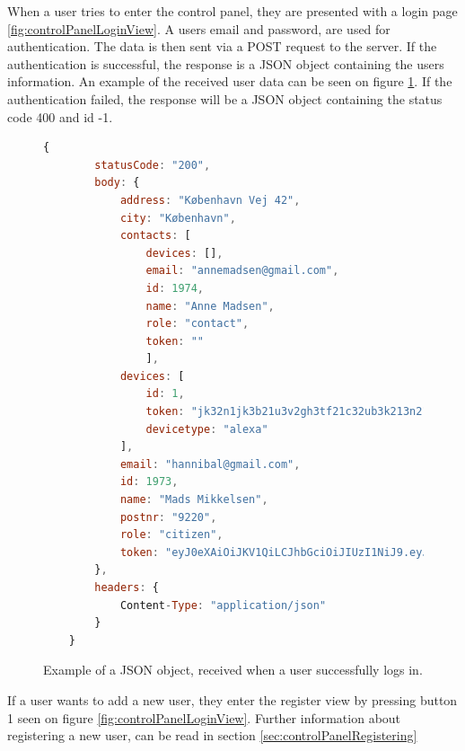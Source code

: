 When a user tries to enter the control panel, they are presented with a login page \ref{fig:controlPanelLoginView}. A users email and password, are used for authentication. The data is then sent via a POST request to the server. If the authentication is successful, the response is a JSON object containing the users information. An example of the received user data can be seen on figure \ref{lst:userLoginJSON}. If the authentication failed, the response will be a JSON object containing the status code 400 and id -1.

\begin{figure}[H]
    \centering
    \begin{lstlisting}[language=Javascript]
    {
        statusCode: "200",
        body: {
            address: "København Vej 42",
            city: "København",
            contacts: [
                devices: [],
                email: "annemadsen@gmail.com",
                id: 1974,
                name: "Anne Madsen",
                role: "contact",
                token: ""
                ],
            devices: [
                id: 1,
                token: "jk32n1jk3b21u3v2gh3tf21c32ub3k213n21kjn32hj",
                devicetype: "alexa"
            ],
            email: "hannibal@gmail.com",
            id: 1973,
            name: "Mads Mikkelsen",
            postnr: "9220",
            role: "citizen", 
            token: "eyJ0eXAiOiJKV1QiLCJhbGciOiJIUzI1NiJ9.eyJ1c2VyX2lkIjoxOTczLCJ1c2VyX3JvbGUiOiJjaXRpemVuIn0.V3uJvt2lb4odiXvHLz4g-NbX_1ogrM1WkIeoubvLiHg"
        },
        headers: {
            Content-Type: "application/json"
        }
    }
    \end{lstlisting}
    \caption{Example of a JSON object, received when a user successfully logs in.}
    \label{lst:userLoginJSON}
\end{figure}

If a user wants to add a new user, they enter the register view by pressing button 1 seen on figure \ref{fig:controlPanelLoginView}. Further information about registering a new user, can be read in section \ref{sec:controlPanelRegistering}

